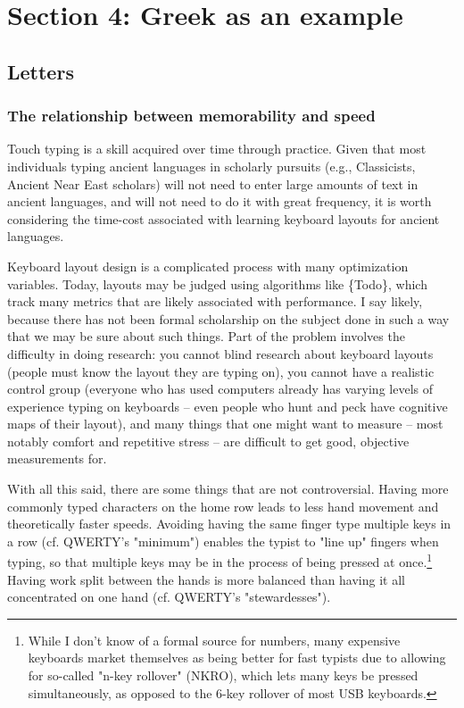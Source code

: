 \documentclass[11pt]{article}
\begin{document}
\section{Section 4: Greek as an example}
\label{sec:org2f6713c}

\subsection{Letters}
\label{sec:org48d7d82}

\subsubsection{The relationship between memorability and speed}
\label{sec:org800ffbf}

Touch typing is a skill acquired over time through practice. Given that most individuals typing ancient languages in scholarly pursuits (e.g., Classicists, Ancient Near East scholars) will not need to enter large amounts of text in ancient languages, and will not need to do it with great frequency, it is worth considering the time-cost associated with learning keyboard layouts for ancient languages.

Keyboard layout design is a complicated process with many optimization variables. Today, layouts may be judged using algorithms like \{Todo\}, which track many metrics that are likely associated with performance. I say likely, because there has not been formal scholarship on the subject done in such a way that we may be sure about such things. Part of the problem involves the difficulty in doing research: you cannot blind research about keyboard layouts (people must know the layout they are typing on), you cannot have a realistic control group (everyone who has used computers already has varying levels of experience typing on keyboards -- even people who hunt and peck have cognitive maps of their layout), and many things that one might want to measure -- most notably comfort and repetitive stress -- are difficult to get good, objective measurements for.

With all this said, there are some things that are not controversial. Having more commonly typed characters on the home row leads to less hand movement and theoretically faster speeds. Avoiding having the same finger type multiple keys in a row (cf. QWERTY's "minimum") enables the typist to "line up" fingers when typing, so that multiple keys may be in the process of being pressed at once.\footnote{While I don't know of a formal source for numbers, many expensive keyboards market themselves as being better for fast typists due to allowing for so-called "n-key rollover" (NKRO), which lets many keys be pressed simultaneously, as opposed to the 6-key rollover of most USB keyboards.} Having work split between the hands is more balanced than having it all concentrated on one hand (cf. QWERTY's "stewardesses").
\end{document}
